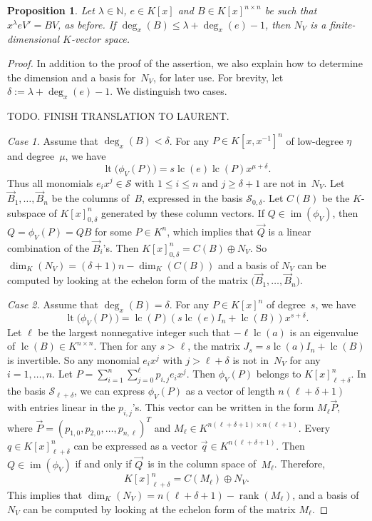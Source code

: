 \documentclass[final,1p,times,authoryear]{elsarticle}
\newtheorem{prop}[theorem]{Proposition}
\newcommand{\cS}{ {\mathcal S}}
\let\set\mathbb
\def\lc{\operatorname{lc}}
\def\rank{\operatorname{rank}}
\def\lt{\operatorname{lt}}
\def\im{\operatorname{im}}
\begin{document}
\begin{prop}\label{PROP:finite}
Let $\lambda\in\set N$, $e\in K[x]$ and $B\in K[x]^{n \times n}$ be such that $x^\lambda eV'=BV$, as before.
If $\deg_x(B) \leq \lambda+\deg_x(e)-1$, then $N_V$ is a finite-dimensional $K$-vector space.
\end{prop}
\begin{proof}
In addition to the proof of the assertion, we also explain how to determine
the dimension and a basis for~$N_V$, for later use. For brevity, let
$\delta:=\lambda+\deg_x(e)-1$. We distinguish two cases.

TODO. FINISH TRANSLATION TO LAURENT.

\smallskip
{\it Case 1.}
Assume that $\deg_x(B) < \delta$. For any $P\in K[x,x^{-1}]^n$ of low-degree $\eta$ and degree~$\mu$, we have
\[
  \lt\bigl(\phi_V(P)\bigr) = s\lc(e)\lc(P)x^{\mu+\delta}.
\]
Thus all monomials $e_i x^j\in \cS$ with $1\leq i\leq n$ and $j\geq \delta+1$ are not in~$N_V$.
Let $\vec{B}_1, \ldots, \vec{B}_n$ be the columns of~$B$, expressed in the basis $\cS_{0,\delta}$.
Let $C(B)$ be the $K$-subspace of $K[x]_{0,\delta}^n$ generated by these column vectors.
If $Q\in \im(\phi_V)$, then $Q = \phi_V(P) = QB$ for some $P\in K^n$, which implies that
$\vec{Q}$ is a linear combination of the $\vec{B}_i$'s. Then $K[x]_{0,\delta}^n = C(B) \oplus N_V$.
So $\dim_K(N_V)= (\delta+1)n - \dim_K(C(B))$ and a basis of $N_V$ can be computed by
looking at the echelon form of the matrix $\bigl(\vec{B}_1, \ldots, \vec{B}_n\bigr)$.

\smallskip
{\it Case 2.}
Assume that $\deg_x(B)=\delta$. For any $P\in K[x]^n$ of degree~$s$, we have
\[
  \lt\bigl(\phi_V(P)\bigr) = \lc(P)(s\lc(e)I_n + \lc(B))x^{s+\delta}.
\]
Let $\ell$ be the largest nonnegative integer such that $-\ell \lc(a)$ is an
eigenvalue of $\lc(B)\in K^{n\times n}$. Then for any $s>\ell$,
the matrix $J_s = s\lc(a)I_n + \lc(B)$ is invertible. So any monomial $e_ix^j$ with $j> \ell+\delta$ is not in~$N_V$
for any $i=1, \ldots, n$. Let $P = \sum_{i=1}^n \sum_{j=0}^{\ell} p_{i, j} e_ix^j$.
Then $\phi_V(P)$ belongs to $K[x]_{\ell+\delta}^n$.
In the basis $\cS_{\ell+\delta}$, we can
express $\phi_V(P)$ as a vector of length ${n(\ell+\delta+1)}$ with entries linear in the $p_{i, j}$'s.
This vector can be written in the form $M_{\ell} \vec{P}$,
where $\vec{P} = (p_{1, 0}, p_{2, 0}, \ldots, p_{n, \ell})^T$ and $M_{\ell} \in K^{n(\ell+\delta+1) \times n(\ell+1)}$.
Every $q\in K[x]_{\ell+\delta}^n$ can be expressed as a vector $\vec{q} \in K^{n(\ell + \delta +1)}$.
Then $Q\in\im(\phi_V)$ if and only if $\vec{Q}\,$ is in the column space of~$M_{\ell}$.
Therefore,
\[K[x]_{\ell+\delta}^n = C({M_{\ell}}) \oplus N_V. \]
This implies that $\dim_K(N_V) = n(\ell+\delta+1) - \rank({M_{\ell}})$, and
a basis of $N_V$ can be computed by
looking at the echelon form of the matrix ${M_{\ell}}$.
\end{proof}
\end{document}

